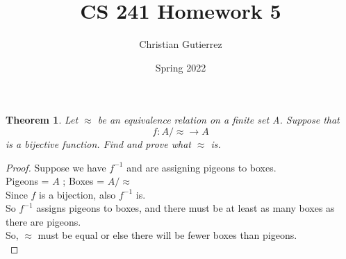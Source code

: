 \documentclass{article}
\title{CS 241 Homework 5}
\author{Christian Gutierrez}
\date{Spring 2022}
\newtheorem{theorem}{Theorem}
\begin{document}
\maketitle

\newpage


\begin{theorem}
  Let $\approx$ be an equivalence relation on a finite set A. Suppose that \\
  \begin{equation}
    f : A/ \approx\rightarrow A
  \end{equation}
  is a bijective function. Find and prove what $\approx$ is.
\end{theorem}
\begin{proof}Suppose we have $f^{-1}$ and are assigning pigeons to boxes.\\
Pigeons = $A$ ; Boxes = $A/\approx$\\
Since $f$ is a bijection, also $f^{-1}$ is.\\
So $f^{-1}$ assigns pigeons to boxes, and there must be at least as many boxes as there are pigeons.\\
So, $\approx$ must be equal or else there will be fewer boxes than pigeons.\\

\end{proof}
\newpage
\end{document}
